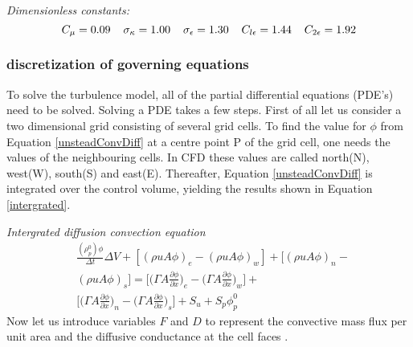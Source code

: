 \documentclass{CFD2017}
\begin{document}
\emph{Dimensionless constants:}
\begin{equation*}
\label{dimConst}
C_{\mu}=0.09 \hspace{4mm} \sigma_{\kappa}=1.00\hspace{4mm}\sigma_{\epsilon}=1.30\hspace{4mm}C_{l\epsilon}=1.44\hspace{4mm}C_{2\epsilon}=1.92
\end{equation*}


\subsubsection{discretization of governing equations}
To solve the turbulence model, all of the partial differential equations (PDE's) need to be solved. Solving a PDE takes a few steps. First of all let us consider a two dimensional grid consisting of several grid cells. To find the value for $\phi$ from Equation \ref{unsteadConvDiff} at a centre point P of the grid cell, one needs the values of the neighbouring cells. In CFD these values are called north(N), west(W), south(S) and east(E). Thereafter, Equation \ref{unsteadConvDiff} is integrated over the control volume, yielding the results shown in Equation \ref{intergrated}.\vspace{2mm}

\emph{Intergrated diffusion convection equation}
\begin{equation}
\begin{split}
\label{intergrated}
&\frac{(\rho_p^0)\phi}{\Delta t}\Delta V +[(\rho u A \phi)_e -(\rho u A \phi)_w]+[(\rho u A \phi)_n -\\
&(\rho u A \phi)_s]=\bigg[\bigg(\Gamma A \frac{\partial \phi}{\partial x}\bigg)_e -\bigg(\Gamma A \frac{\partial \phi}{\partial x}\bigg)_w\bigg] +\\
&\bigg[\bigg(\Gamma A \frac{\partial \phi}{\partial x}\bigg)_n -\bigg(\Gamma A \frac{\partial \phi}{\partial x}\bigg)_s\bigg] + S_u + S_p\phi_p^0
\end{split}
\end{equation}
Now let us introduce variables $F$ and $D$ to represent the convective mass flux per unit area and the diffusive conductance at the cell faces \cite{Versteeg2007}.\vspace{2mm}
\end{document}
